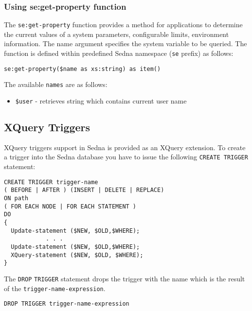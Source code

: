 \documentclass[a4paper,12pt]{article}
\begin{document}
\subsubsection*{Using se:get-property function}
The \verb!se:get-property! function provides a method for applications to determine the current values of a system parameters, configurable limits, environment information.
The name argument specifies the system variable to be queried. The function is defined within predefined Sedna namespace (\verb!se! prefix) as follows:

\begin{verbatim}
se:get-property($name as xs:string) as item()
\end{verbatim}

The available \verb!names! are as follows:

\begin{itemize}
\item \verb!$user! - retrieves string which contains current user name
\end{itemize}

\subsection{XQuery Triggers}

XQuery triggers support in Sedna is provided as an XQuery extension. To create a trigger into the Sedna database you have to issue the following \verb!CREATE TRIGGER! statement:

\begin{verbatim}
CREATE TRIGGER trigger-name
( BEFORE | AFTER ) (INSERT | DELETE | REPLACE)
ON path
( FOR EACH NODE | FOR EACH STATEMENT )
DO
{
  Update-statement ($NEW, $OLD,$WHERE);
            . . .
  Update-statement ($NEW, $OLD,$WHERE);
  XQuery-statement ($NEW, $OLD, $WHERE);
}
\end{verbatim}

The \verb!DROP! \verb!TRIGGER! statement drops the trigger with the
name which is the result of the \verb!trigger-name-expression!.

\begin{verbatim}
DROP TRIGGER trigger-name-expression
\end{verbatim}
\end{document}
